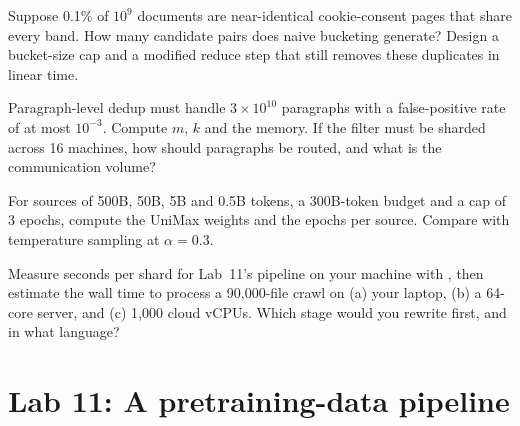 \begin{exercise}
Suppose 0.1\% of $10^{9}$ documents are near-identical cookie-consent pages that share every band.
How many candidate pairs does naive bucketing generate? Design a bucket-size cap and a
modified reduce step that still removes these duplicates in linear time.
\end{exercise}

\begin{exercise}
Paragraph-level dedup must handle $3\times10^{10}$ paragraphs with a false-positive rate of at most
$10^{-3}$. Compute $m$, $k$ and the memory. If the filter must be sharded across 16 machines,
how should paragraphs be routed, and what is the communication volume?
\end{exercise}

\begin{exercise}
For sources of 500B, 50B, 5B and 0.5B tokens, a 300B-token budget and a cap of 3 epochs, compute
the UniMax weights and the epochs per source. Compare with temperature sampling at $\alpha=0.3$.
\end{exercise}

\begin{exercise}
Measure seconds per shard for Lab~11's pipeline on your machine with , then
estimate the wall time to process a 90{,}000-file crawl on (a) your laptop, (b) a 64-core server,
and (c) 1{,}000 cloud vCPUs. Which stage would you rewrite first, and in what language?
\end{exercise}

\section{Lab 11: A pretraining-data pipeline}\label{sec:data:lab}

